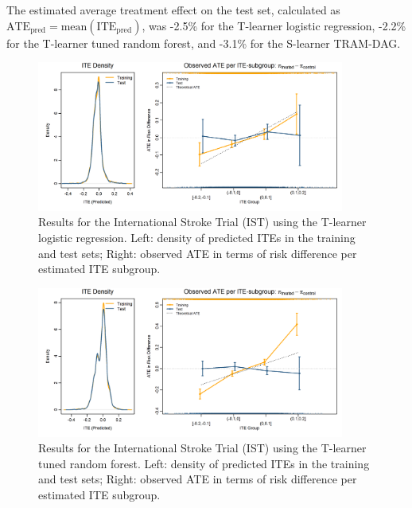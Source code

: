 The estimated average treatment effect on the test set, calculated as $\text{ATE}_\text{pred}=\text{mean}(\text{ITE}_\text{pred})$, was -2.5\% for the T-learner logistic regression, -2.2\% for the T-learner tuned random forest, and -3.1\% for the S-learner TRAM-DAG.  




\begin{figure}[htbp]
\centering
\includegraphics[width=0.9\textwidth]{img/results_IST/glm_tlearner_density_ITE_ATE.png}
\caption{Results for the International Stroke Trial (IST) using the T-learner logistic regression. Left: density of predicted ITEs in the training and test sets; Right: observed ATE in terms of risk difference per estimated ITE subgroup.}
\label{fig:IST_density_ITE_ATE_glm_tlearner}
\end{figure}



\begin{figure}[htbp]
\centering
\includegraphics[width=0.9\textwidth]{img/results_IST/IST_tuned_rf_tlearner_density_ITE_ATE.png}
\caption{Results for the International Stroke Trial (IST) using the T-learner tuned random forest. Left: density of predicted ITEs in the training and test sets; Right: observed ATE in terms of risk difference per estimated ITE subgroup.}
\label{fig:IST_density_ITE_ATE_tuned_rf}
\end{figure}




